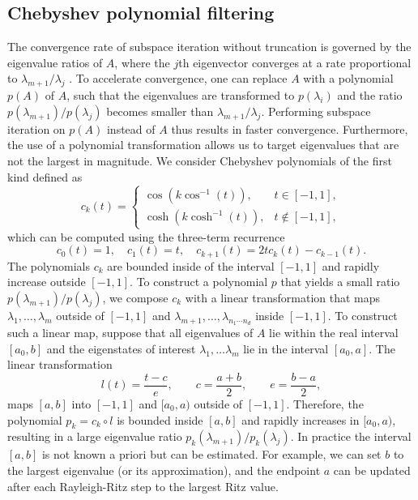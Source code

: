 \documentclass[10pt,preprint]{elsarticle}
\begin{document}
\subsection{Chebyshev polynomial filtering}
\label{sec:cheb_filtering}


The convergence rate of subspace iteration without truncation is governed by the eigenvalue ratios of $A$, where the $j$th eigenvector converges at a rate proportional to $\lambda_{m+1}/\lambda_j$ \cite{Saad2011}. To accelerate convergence, one can replace $A$ with a polynomial $p(A)$ of $A$, such that the eigenvalues are transformed to $p(\lambda_i)$ and the ratio $p(\lambda_{m+1})/p(\lambda_j)$ becomes smaller than $\lambda_{m+1}/\lambda_j$. Performing subspace iteration on $p(A)$ instead of $A$ thus results in faster convergence. Furthermore, the use of a polynomial transformation allows us to target eigenvalues that are not the largest in magnitude. We consider Chebyshev polynomials of the first kind \cite{Saad_2016} defined as 
\begin{equation}
c_k(t) = 
\begin{cases}
\cos\left(k \cos^{-1}(t)\right), & t \in [-1,1], \\
\cosh\left(k \cosh^{-1}(t)\right), & t \not\in [-1,1], 
\end{cases}
\end{equation}
which can be computed using the three-term recurrence 
\begin{equation}
\label{cheby_three_term}
c_0(t) = 1, \quad 
c_1(t) = t, \quad
c_{k+1}(t) = 2t c_k(t) - c_{k-1}(t). 
\end{equation}
The polynomials $c_k$ are bounded inside of the interval $[-1,1]$ and rapidly increase outside $[-1,1]$. To construct a polynomial $p$ that yields a small ratio $p(\lambda_{m+1})/p(\lambda_j)$, we compose $c_k$ with a linear transformation that maps $\lambda_1,\ldots,\lambda_m$ outside of $[-1,1]$ and  $\lambda_{m+1},\ldots,\lambda_{n_1\cdots n_d}$ inside $[-1,1]$. To construct such a linear map, suppose that all eigenvalues of $A$ lie within the real interval $[a_0,b]$ and the eigenstates of interest $\lambda_1,\ldots \lambda_m$ lie in the interval $[a_0,a]$. The linear transformation 
\begin{equation} \label{eq:linear_trans}
l(t) = \frac{t-c}{e}, \qquad c = \frac{a+b}{2}, \qquad e = \frac{b-a}{2},
\end{equation}
maps $[a,b]$ into $[-1,1]$ and $[a_0,a)$ outside of $[-1,1]$. Therefore, the polynomial $p_k = c_k \circ l$ is bounded inside $[a,b]$ and rapidly increases in $[a_0,a)$, resulting in a large eigenvalue ratio $p_k(\lambda_{m+1})/p_k(\lambda_j)$. In practice the interval $[a,b]$ is not known a priori but can be estimated. For example, we can set $b$ to the largest eigenvalue (or its approximation), and the endpoint $a$ can be updated after each Rayleigh-Ritz step to the largest Ritz value. 
\end{document}
